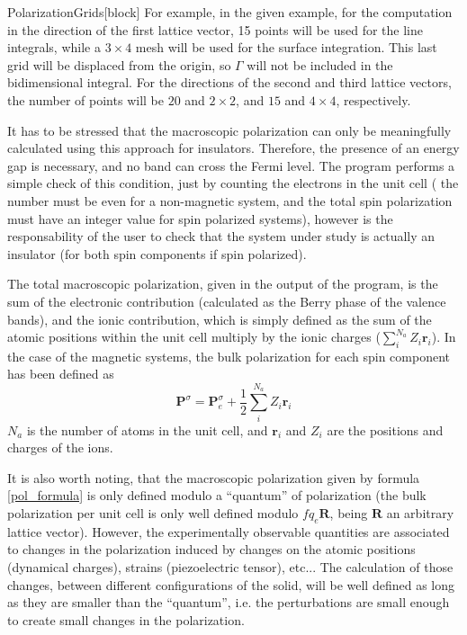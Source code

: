 \begin{fdfentry}{PolarizationGrids}[block]
  For example, in the given example, for the computation in the
  direction of the first lattice vector, 15 points will be used for
  the line integrals, while a $3\times4$ mesh will be used for the
  surface integration. This last grid will be displaced from the
  origin, so $\Gamma$ will not be included in the bidimensional
  integral. For the directions of the second and third lattice
  vectors, the number of points will be $20$ and $2\times2$, and $15$
  and $4\times4$, respectively.

  It has to be stressed that the macroscopic polarization can only be
  meaningfully calculated using this approach for insulators.
  Therefore, the presence of an energy gap is necessary, and no band
  can cross the Fermi level. The program performs a simple check of
  this condition, just by counting the electrons in the unit cell (
  the number must be even for a non-magnetic system, and the total
  spin polarization must have an integer value for spin polarized
  systems), however is the responsability of the user to check that
  the system under study is actually an insulator (for both spin
  components if spin polarized).

  The total macroscopic polarization, given in the output of the
  program, is the sum of the electronic contribution (calculated as
  the Berry phase of the valence bands), and the ionic contribution,
  which is simply defined as the sum of the atomic positions within
  the unit cell multiply by the ionic charges
  ($\sum_i^{N_a} Z_i \mathbf{r}_i$).  In the case of the magnetic
  systems, the bulk polarization for each spin component has been
  defined as
  \begin{equation}
    \mathbf{P}^\sigma = \mathbf{P}_e^\sigma +
    \frac12 \sum_i^{N_a}  Z_i \mathbf{r}_i
  \end{equation}
  $N_a$ is the number of atoms in the unit cell, and $\mathbf{r}_i$
  and $Z_i$ are the positions and charges of the ions.

  It is also worth noting, that the macroscopic polarization given by
  formula \eqref{pol_formula} is only defined modulo a ``quantum'' of
  polarization (the bulk polarization per unit cell is only well
  defined modulo $fq_e\mathbf{R}$, being $\mathbf{R}$ an arbitrary
  lattice vector). However, the experimentally observable quantities
  are associated to changes in the polarization induced by changes on
  the atomic positions (dynamical charges), strains (piezoelectric
  tensor), etc... The calculation of those changes, between different
  configurations of the solid, will be well defined as long as they
  are smaller than the ``quantum'', i.e. the perturbations are small
  enough to create small changes in the polarization.

\end{fdfentry}

